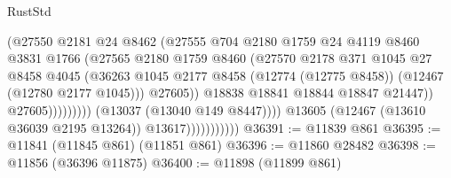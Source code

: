 \begin{lexlean}{RustStd}
\begin{coremodule}
                                                (@27550
                                                  @2181
                                                  @24
                                                  @8462
                                                  (@27555
                                                    @704
                                                    @2180
                                                    @1759
                                                    @24
                                                    @4119
                                                    @8460
                                                    @3831
                                                    @1766
                                                    (@27565
                                                      @2180
                                                      @1759
                                                      @8460
                                                      (@27570
                                                        @2178
                                                        @371
                                                        @1045
                                                        @27
                                                        @8458
                                                        @4045
                                                        (@36263
                                                          @1045
                                                          @2177
                                                          @8458
                                                          (@12774 (@12775 @8458))
                                                          (@12467 (@12780 @2177 @1045)))
                                                        @27605))
                                                    @18838
                                                    @18841
                                                    @18844
                                                    @18847
                                                    @21447))
                                                @27605)))))))))
                              (@13037 (@13040 @149 @8447))))
                          @13605
                          (@12467 (@13610 @36039 @2195 @13264))
                          @13617)))))))))))
@36391 := @11839 @861
@36395 := @11841 (@11845 @861) (@11851 @861)
@36396 := @11860 @28482
@36398 := @11856 (@36396 @11875)
@36400 := @11898 (@11899 @861)

\end{coremodule}
\end{lexlean}
